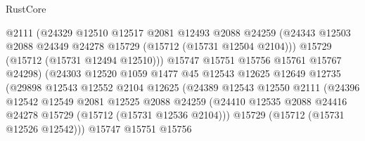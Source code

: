\begin{lexlean}{RustCore}
\begin{coremodule}
                                @2111
                                (@24329
                                  @12510
                                  @12517
                                  @2081
                                  @12493
                                  @2088
                                  @24259
                                  (@24343
                                    @12503
                                    @2088
                                    @24349
                                    @24278
                                    @15729
                                    (@15712 (@15731 @12504 @2104)))
                                  @15729
                                  (@15712 (@15731 @12494 @12510)))
                                @15747
                                @15751
                                @15756
                                @15761
                                @15767
                                @24298)
                              (@24303
                                @12520
                                @1059
                                @1477
                                @45
                                @12543
                                @12625
                                @12649
                                @12735
                                (@29898
                                  @12543
                                  @12552
                                  @2104
                                  @12625
                                  (@24389
                                    @12543
                                    @12550
                                    @2111
                                    (@24396
                                      @12542
                                      @12549
                                      @2081
                                      @12525
                                      @2088
                                      @24259
                                      (@24410
                                        @12535
                                        @2088
                                        @24416
                                        @24278
                                        @15729
                                        (@15712 (@15731 @12536 @2104)))
                                      @15729
                                      (@15712 (@15731 @12526 @12542)))
                                    @15747
                                    @15751
                                    @15756

\end{coremodule}
\end{lexlean}

